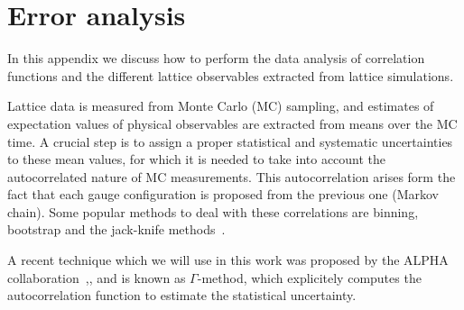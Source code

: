 
\chapter{Error analysis}
\label{appex_errors}

In this appendix we discuss how to perform the data analysis of correlation functions and the different lattice observables extracted from lattice simulations. 

Lattice data is measured from Monte Carlo (MC) sampling, and estimates of expectation values of physical observables are extracted from means over the MC time. A crucial step is to assign a proper statistical and systematic uncertainties to these mean values, for which it is needed to take into account the autocorrelated nature of MC measurements. This autocorrelation arises form the fact that each gauge configuration is proposed from the previous one (Markov chain). Some popular methods to deal with these correlations are binning, bootstrap and the jack-knife methods~\cite{}.

A recent technique which we will use in this work was proposed by the ALPHA collaboration~\citep{Schaefer:2010hu},\citep{Wolff:2003sm},\citep{Ramos:2018vgu} and is known as $\Gamma$-method, which explicitely computes the autocorrelation function to estimate the statistical uncertainty.

